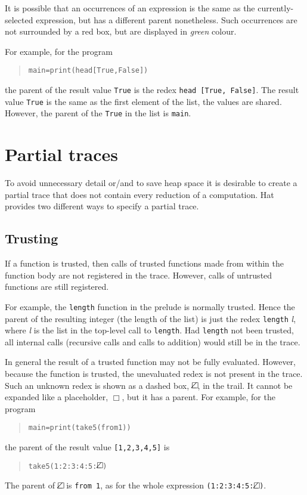 \documentclass[12pt]{article}
\newenvironment{code}{\begin{quote}\begin{alltt}}{\end{alltt}\end{quote}}
\newcommand{\emptyBox}{\Box}
\newcommand{\dashedBox}{\Box\hspace{-9pt}\angle}
\begin{document}
It is possible that an occurrences of an expression is the same as the currently-selected expression, but has a different parent nonetheless. Such occurrences are not surrounded by a red box, but are displayed in \emph{green} colour.

For example, for the program
\begin{code}
main = print (head [True, False])
\end{code}
the parent of the result value \texttt{True} is the redex
\texttt{head [True, False]}. The result value \texttt{True} is the same as the first element of the list, the values are shared. However, the parent of the \texttt{True} in the list is \texttt{main}. 




\section{Partial traces}

To avoid unnecessary detail or/and to save heap space it is desirable to create a partial trace that does not contain every reduction of a computation.
Hat provides two different ways to specify a partial trace.


\subsection{Trusting}\label{trusting}

If a function is trusted, then calls of trusted functions made from within the function body are not registered in the trace. However, calls of untrusted functions are still registered.

For example, the \texttt{length} function in the prelude is normally trusted. Hence the parent of the resulting integer (the length of the list) is just the redex \texttt{length} \emph{l}, where \emph{l} is the list in the top-level call to \texttt{length}. Had \texttt{length} not been trusted, all internal calls (recursive calls and calls to addition) would still be in the trace.

In general the result of a trusted function may not be fully evaluated. However, because the function is trusted, the unevaluated redex is not present in the trace. Such an unknown redex is shown as a dashed box, $\dashedBox$, in the trail. It cannot be expanded like a placeholder, $\emptyBox$, but it has a parent.
For example, for the program
\begin{code}
main = print (take 5 (from 1))
\end{code}  
the parent of the result value \texttt{[1,2,3,4,5]} is
\begin{code}
take 5 (1:2:3:4:5:\(\dashedBox\))
\end{code}
The parent of $\dashedBox$ is \texttt{from 1}, as for the whole expression
\texttt{(1:2:3:4:5:\(\dashedBox\))}.
\end{document}
